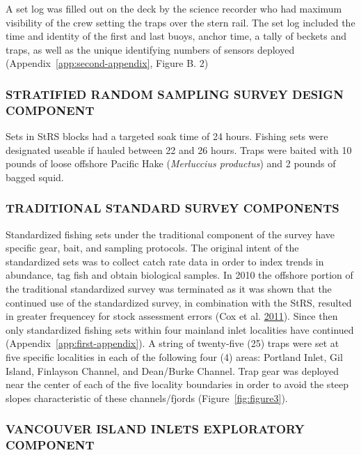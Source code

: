 \documentclass[12pt]{article}\usepackage[]{graphicx}\usepackage[]{color}
\begin{document}
A set log was filled out on the deck by the science recorder who had maximum visibility of the crew setting the traps over the stern rail. The set log included the time and identity of the first and last buoys, anchor time, a tally of beckets and traps, as well as the unique identifying numbers of sensors deployed (Appendix~\ref{app:second-appendix}, Figure B. 2)

\hypertarget{stratified-random-sampling-survey-design-component-1}{%
\subsubsection{STRATIFIED RANDOM SAMPLING SURVEY DESIGN COMPONENT}\label{stratified-random-sampling-survey-design-component-1}}

Sets in StRS blocks had a targeted soak time of 24 hours. Fishing sets were designated useable if hauled between 22 and 26 hours. Traps were baited with 10 pounds of loose offshore Pacific Hake (\emph{Merluccius productus}) and 2 pounds of bagged squid.

\hypertarget{traditional-standard-survey-components-1}{%
\subsubsection{TRADITIONAL STANDARD SURVEY COMPONENTS}\label{traditional-standard-survey-components-1}}

Standardized fishing sets under the traditional component of the survey have specific gear, bait, and sampling protocols. The original intent of the standardized sets was to collect catch rate data in order to index trends in abundance, tag fish and obtain biological samples. In 2010 the offshore portion of the traditional standardized survey was terminated as it was shown that the continued use of the standardized survey, in combination with the StRS, resulted in greater frequencey for stock assessment errors (Cox et al. \protect\hyperlink{ref-Cox2011}{2011}). Since then only standardized fishing sets within four mainland inlet localities have continued (Appendix~\ref{app:first-appendix}). A string of twenty-five (25) traps were set at five specific localities in each of the following four (4) areas: Portland Inlet, Gil Island, Finlayson Channel, and Dean/Burke Channel. Trap gear was deployed near the center of each of the five locality boundaries in order to avoid the steep slopes characteristic of these channels/fjords (Figure~\ref{fig:figure3}).

\hypertarget{vancouver-island-inlets-exploratory-component}{%
\subsubsection{VANCOUVER ISLAND INLETS EXPLORATORY COMPONENT}\label{vancouver-island-inlets-exploratory-component}}
\end{document}
